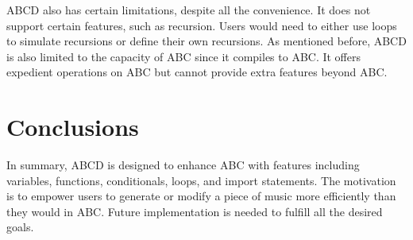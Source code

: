 ABCD also has certain limitations, despite all the convenience. It does not support certain features, such as recursion. Users would need to either use loops to simulate recursions or define their own recursions. As mentioned before, ABCD is also limited to the capacity of ABC since it compiles to ABC. It offers expedient operations on ABC but cannot provide extra features beyond ABC.

\section{Conclusions}
In summary, ABCD is designed to enhance ABC with features including variables, functions, conditionals, loops, and import statements. The motivation is to empower users to generate or modify a piece of music more efficiently than they would in ABC.  Future implementation is needed to fulfill all the desired goals.
